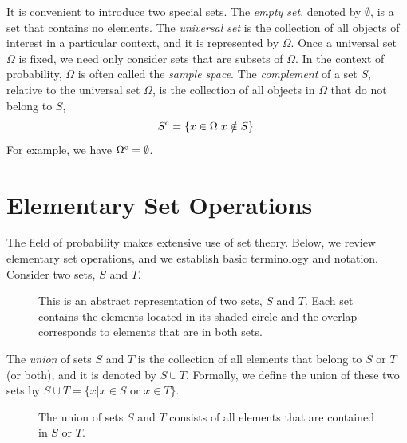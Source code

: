 It is convenient to introduce two special sets.
The \emph{empty set}, denoted by $\emptyset$, is a set that contains no elements.
The \emph{universal set} is the collection of all objects of interest in a particular context, and it is represented by $\Omega$.
Once a universal set $\Omega$ is fixed, we need only consider sets that are subsets of $\Omega$.
In the context of probability, $\Omega$ is often called the \emph{sample space}.
The \emph{complement} of a set $S$, relative to the universal set $\Omega$, is the collection of all objects in $\Omega$ that do not belong to $S$,
\begin{equation*}
S^{\mathrm{c}} = \{ x \in \Omega | x \notin S \}.
\end{equation*}
For example, we have $\Omega^{\mathrm{c}} = \emptyset$.


\section{Elementary Set Operations}

The field of probability makes extensive use of set theory.
Below, we review elementary set operations, and we establish basic terminology and notation.
Consider two sets, $S$ and $T$.

\begin{figure}[htb!]
\begin{center}
\caption{This is an abstract representation of two sets, $S$ and $T$.
Each set contains the elements located in its shaded circle and the overlap corresponds to elements that are in both sets.}
\end{center}
\end{figure}

The \emph{union} of sets $S$ and $T$ is the collection of all elements that belong to $S$ or $T$ (or both), and it is denoted by $S \cup T$.
Formally, we define the union of these two sets by $S \cup T = \{ x | x \in S \text{ or } x \in T \}$.

\begin{figure}[htb!]
\begin{center}
\caption{The union of sets $S$ and $T$ consists of all elements that are contained in $S$ or $T$.}
\end{center}
\end{figure}

